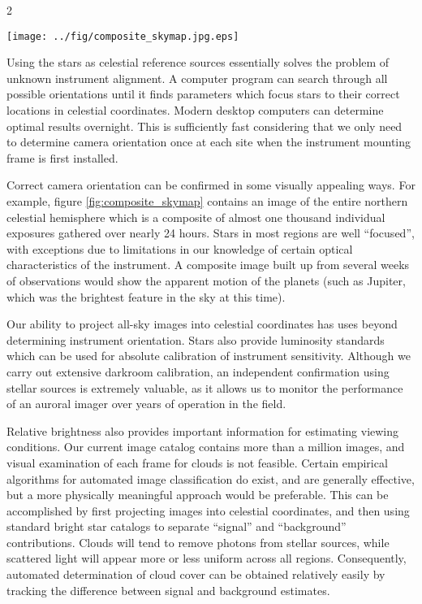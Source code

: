\documentclass[11pt,twoside]{article}   %
\begin{document}
\begin{multicols}{2}
\begin{figure*}[htb!]
  \texttt{[image: ../fig/composite\_skymap.jpg.eps]}
  \caption{Composite of the northern celestial
  hemisphere constructed from nearly 1000 different all-sky images
  obtained during a 12-hour interval.
     \label{fig:composite_skymap}  }
\end{figure*}

Using the stars as celestial reference sources essentially solves
the problem of unknown instrument alignment. A computer program
can search through all possible orientations until it finds
parameters which focus stars to their correct locations in
celestial coordinates. Modern desktop computers can determine
optimal results overnight. This is sufficiently fast considering
that we only need to determine camera orientation once at each
site when the instrument mounting frame is first installed.

Correct camera orientation can be confirmed in some visually
appealing ways.  For example, figure \ref{fig:composite_skymap}
contains an image of the entire northern celestial hemisphere
which is a composite of almost one thousand individual exposures
gathered over nearly 24 hours. Stars in most regions are well
``focused'', with exceptions due to limitations in our knowledge
of certain optical characteristics of the instrument.  A composite
image built up from several weeks of observations would show the
apparent motion of the planets (such as Jupiter, which was the
brightest feature in the sky at this time).


Our ability to project all-sky images into celestial coordinates
has uses beyond determining instrument orientation. Stars also
provide luminosity standards which can be used for absolute
calibration of instrument sensitivity.  Although we carry out
extensive darkroom calibration, an independent confirmation using
stellar sources is extremely valuable, as it allows us to monitor
the performance of an auroral imager over years of operation in
the field.

Relative brightness also provides important information for
estimating viewing conditions.  Our current image catalog contains
more than a million images, and visual examination of each frame
for clouds is not feasible. Certain empirical algorithms for
automated image classification do exist, and are generally
effective, but a more physically meaningful approach would be
preferable.  This can be accomplished by first projecting images
into celestial coordinates, and then using standard bright star
catalogs to separate ``signal'' and ``background'' contributions.
Clouds will tend to remove photons from stellar sources, while
scattered light will appear more or less uniform across all
regions. Consequently, automated determination of cloud cover can
be obtained relatively easily by tracking the difference between
signal and background estimates.


\end{multicols}
\end{document}
